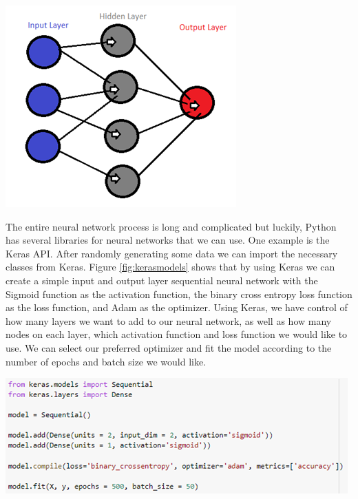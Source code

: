 \documentclass[a4paper,12pt]{report}
\begin{document}
\begin{center}
    \captionsetup{type=figure}
    \includegraphics[width=.9\linewidth]{media/NeuralNetwork.png}
    \label{fig:NeuralNetwork}
\end{center}

The entire neural network process is long and complicated but luckily, Python has several libraries for neural networks that we can use. One example is the Keras API. After randomly generating some data we can import the necessary classes from Keras. Figure \ref{fig:kerasmodels} shows that by using Keras we can create a simple input and output layer sequential neural network with the Sigmoid function as the activation function, the binary cross entropy loss function as the loss function, and Adam as the optimizer. Using Keras, we have control of how many layers we want to add to our neural network, as well as how many nodes on each layer, which activation function and loss function we would like to use. We can select our preferred optimizer and fit the model according to the number of epochs and batch size we would like. 

\begin{center}
    \captionsetup{type=figure}
    \includegraphics[width=.9\linewidth]{media/kerasmodels.png}
    \label{fig:kerasmodels}
\end{center}
\end{document}
